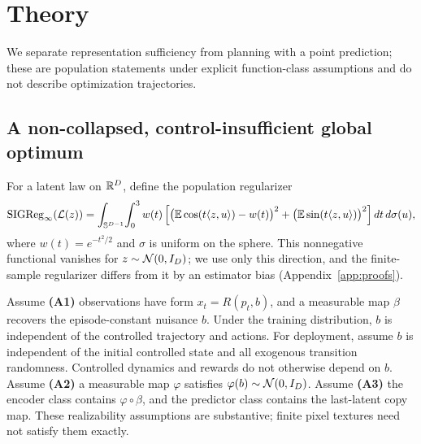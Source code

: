\section{Theory}
\label{sec:theory}

We separate representation sufficiency from planning with a point prediction; these are population
statements under explicit function-class assumptions and do not describe optimization trajectories.

\subsection{A non-collapsed, control-insufficient global optimum}
\label{sec:theory-rep}

For a latent law on $\mathbb{R}^D$, define the population regularizer
\begin{equation}
\label{eq:popsigreg}
\mathrm{SIGReg}_\infty(\mathcal L(z))=
\int_{\mathbb S^{D-1}}\!\int_0^3 w(t)
\left[\big(\mathbb{E}\cos(t\langle z,u\rangle)-w(t)\big)^2
+\big(\mathbb{E}\sin(t\langle z,u\rangle)\big)^2\right]dt\,d\sigma(u),
\end{equation}
where $w(t)=e^{-t^2/2}$ and $\sigma$ is uniform on the sphere.
This nonnegative functional vanishes for $z\sim\mathcal{N}(0,I_D)$; we use only this direction, and the
finite-sample regularizer differs from it by an estimator bias (Appendix~\ref{app:proofs}).

Assume \textbf{(A1)} observations have form $x_t=R(p_t,b)$, and a measurable map $\beta$ recovers the episode-constant nuisance $b$.
Under the training distribution, $b$ is independent of the controlled trajectory and actions.
For deployment, assume $b$ is independent of the initial controlled state and all exogenous transition randomness.
Controlled dynamics and rewards do not otherwise depend on $b$.
Assume \textbf{(A2)} a measurable map $\varphi$ satisfies $\varphi(b)\sim\mathcal{N}(0,I_D)$.
Assume \textbf{(A3)} the encoder class contains $\varphi\circ\beta$, and the predictor class contains the last-latent copy map.
These realizability assumptions are substantive; finite pixel textures need not satisfy them exactly.

